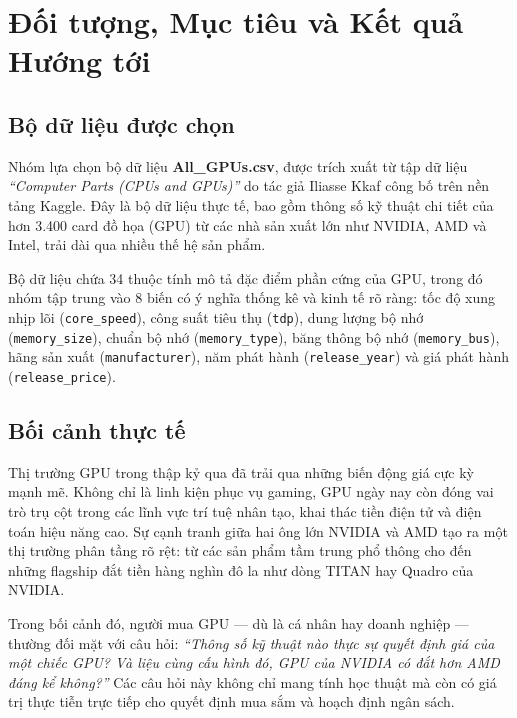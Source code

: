 \documentclass[a4paper]{article}
\begin{document}
	\thispagestyle{empty}
	
	\newpage
	\tableofcontents
	\newpage

\section{Đối tượng, Mục tiêu và Kết quả Hướng tới}

\subsection{Bộ dữ liệu được chọn}

Nhóm lựa chọn bộ dữ liệu \textbf{All\_GPUs.csv}, được trích xuất từ tập dữ liệu \textit{``Computer Parts (CPUs and GPUs)''} do tác giả Iliasse Kkaf công bố trên nền tảng Kaggle. Đây là bộ dữ liệu thực tế, bao gồm thông số kỹ thuật chi tiết của hơn 3.400 card đồ họa (GPU) từ các nhà sản xuất lớn như NVIDIA, AMD và Intel, trải dài qua nhiều thế hệ sản phẩm.

Bộ dữ liệu chứa 34 thuộc tính mô tả đặc điểm phần cứng của GPU, trong đó nhóm tập trung vào 8 biến có ý nghĩa thống kê và kinh tế rõ ràng: tốc độ xung nhịp lõi (\texttt{core\_speed}), công suất tiêu thụ (\texttt{tdp}), dung lượng bộ nhớ (\texttt{memory\_size}), chuẩn bộ nhớ (\texttt{memory\_type}), băng thông bộ nhớ (\texttt{memory\_bus}), hãng sản xuất (\texttt{manufacturer}), năm phát hành (\texttt{release\_year}) và giá phát hành (\texttt{release\_price}).

\subsection{Bối cảnh thực tế}

Thị trường GPU trong thập kỷ qua đã trải qua những biến động giá cực kỳ mạnh mẽ. Không chỉ là linh kiện phục vụ gaming, GPU ngày nay còn đóng vai trò trụ cột trong các lĩnh vực trí tuệ nhân tạo, khai thác tiền điện tử và điện toán hiệu năng cao. Sự cạnh tranh giữa hai ông lớn NVIDIA và AMD tạo ra một thị trường phân tầng rõ rệt: từ các sản phẩm tầm trung phổ thông cho đến những flagship đắt tiền hàng nghìn đô la như dòng TITAN hay Quadro của NVIDIA.

Trong bối cảnh đó, người mua GPU — dù là cá nhân hay doanh nghiệp — thường đối mặt với câu hỏi: \textit{``Thông số kỹ thuật nào thực sự quyết định giá của một chiếc GPU? Và liệu cùng cấu hình đó, GPU của NVIDIA có đắt hơn AMD đáng kể không?''} Các câu hỏi này không chỉ mang tính học thuật mà còn có giá trị thực tiễn trực tiếp cho quyết định mua sắm và hoạch định ngân sách.
\end{document}
